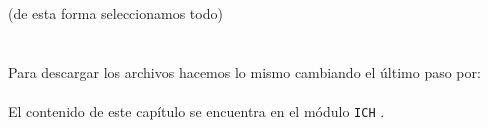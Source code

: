  (de esta forma seleccionamos todo)\\

\\

\\


Para descargar los archivos hacemos lo mismo cambiando el último paso por:\\

\\




El contenido de este capítulo se encuentra en el módulo \texttt{ICH} 
.

